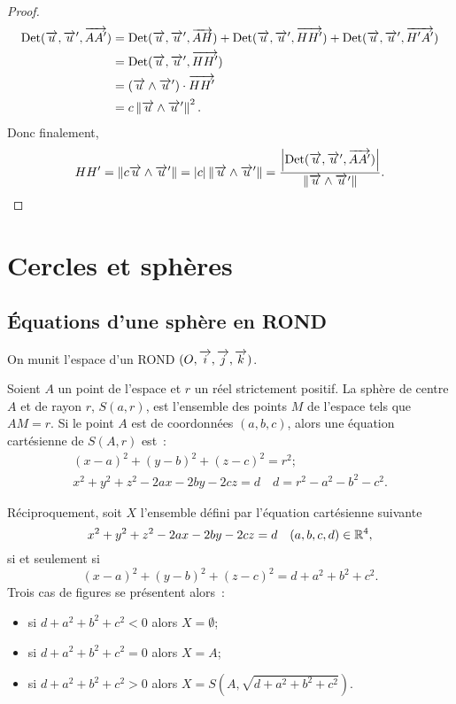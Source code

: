 \begin{proof}
  \begin{align}
    \operatorname{Det}(\overrightarrow{u}, \overrightarrow{u}', \overrightarrow{AA'}) &= \operatorname{Det}(\overrightarrow{u}, \overrightarrow{u}',\overrightarrow{AH}) + \operatorname{Det}(\overrightarrow{u},
    \overrightarrow{u}',\overrightarrow{HH'}) + \operatorname{Det}(\overrightarrow{u}, \overrightarrow{u}', \overrightarrow{H'A'})\\
                                &= \operatorname{Det}(\overrightarrow{u}, \overrightarrow{u}',\overrightarrow{HH'})\\
                                &= (\overrightarrow{u}\wedge\overrightarrow{u}')\cdot\overrightarrow{HH'}\\
                                &= c\left\lVert\overrightarrow{u}\wedge\overrightarrow{u}'\right\rVert^2.
  \end{align}
  Donc finalement,
  \begin{equation}
    HH' = \left\lVert c\overrightarrow{u}\wedge\overrightarrow{u}'\right\rVert = \left\lvert c\right\rvert\left\lVert\overrightarrow{u}\wedge\overrightarrow{u}'\right\rVert =
    \frac{\left\lvert\operatorname{Det}(\overrightarrow{u}, \overrightarrow{u}',\overrightarrow{AA'})\right\rvert}{\left\lVert\overrightarrow{u}\wedge\overrightarrow{u}'\right\rVert}.
  \end{equation}
\end{proof}

\section{Cercles et sphères}

\subsection{Équations d'une sphère en ROND}

On munit l'espace d'un ROND \((O,\overrightarrow{i},\overrightarrow{j},\overrightarrow{k})\).
\begin{defdef}
  Soient \(A\) un point de l'espace et \(r\) un réel strictement positif. La
  sphère de centre \(A\) et de rayon \(r\), \(S(a, r)\), est l'ensemble des
  points \(M\) de l'espace tels que \(AM = r\). Si le point \(A\) est de
  coordonnées \((a, b, c)\), alors une équation cartésienne de \(S(A, r)\)
  est~:
  \begin{gather}
    (x - a)^2 + (y - b)^2 + (z - c)^2 = r^2; \\
    x^2 + y^2 + z^2 - 2ax - 2by - 2cz = d \quad d = r^2 - a^2 - b^2 - c^2.
  \end{gather}
\end{defdef}

Réciproquement, soit \(X\) l'ensemble défini par l'équation cartésienne
suivante
\begin{equation}
  x^2 + y^2 + z^2 - 2ax - 2by - 2cz = d \quad (a, b, c, d)\in \mathbb{R}^4,
\end{equation}
si et seulement si
\begin{equation}
  (x - a)^2 + (y - b)^2 + (z - c)^2 = d + a^2 + b^2 + c^2.
\end{equation}
Trois cas de figures se présentent alors~:
\begin{itemize}
  \item si \(d + a^2 + b^2 + c^2<0\) alors \(X = \emptyset\);
  \item si \(d + a^2 + b^2 + c^2 = 0\) alors \(X = A\);
  \item si \(d + a^2 + b^2 + c^2>0\) alors \(X = S(A, \sqrt{d + a^2 + b^2 +
    c^2})\).
\end{itemize}

